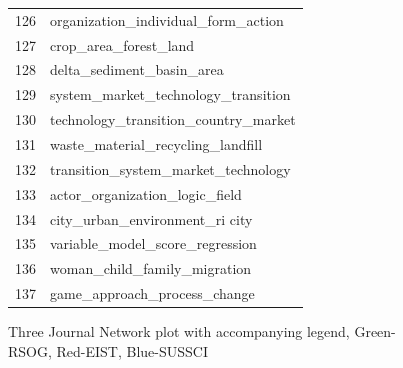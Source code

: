 \documentclass[12pt]{article}
\begin{document}
\begin{landscape}
\begin{figure}[htbp]
\begin{minipage}{0.15\textwidth}
\begin{tabular}{rl}
          126 &                organization\_individual\_form\_action \\
          127 &                              crop\_area\_forest\_land \\
          128 &                          delta\_sediment\_basin\_area \\
          129 &                system\_market\_technology\_transition \\
          130 &               technology\_transition\_country\_market \\
          131 &                  waste\_material\_recycling\_landfill \\
          132 &                transition\_system\_market\_technology \\
          133 &                     actor\_organization\_logic\_field \\
          134 &                     city\_urban\_environment\_ri city \\
          135 &                    variable\_model\_score\_regression \\
          136 &                       woman\_child\_family\_migration \\
          137 &                       game\_approach\_process\_change \\
      \bottomrule
    \end{tabular}
  \end{minipage}
  \caption{Three Journal Network plot with accompanying legend, Green-RSOG, Red-EIST, Blue-SUSSCI}
  \label{fig:3j_network_plot_with_legend}
\end{figure}
\end{landscape}
\end{document}
